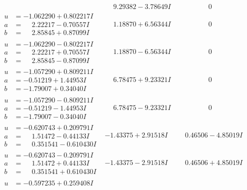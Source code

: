\documentclass[1p]{elsarticle_modified}
\theoremstyle{definition}
\begin{document}
$$\begin{array}{c|c|c}
 & \phantom{-}9.29382 - 3.78649 I & \phantom{-0.000000 } 0 \\ \hline\begin{aligned}
u &= -1.062290 + 0.802217 I \\
a &= \phantom{-}2.22217 - 0.70557 I \\
b &= \phantom{-}2.85845 + 0.87099 I\end{aligned}
 & \phantom{-}1.18870 + 6.56344 I & \phantom{-0.000000 } 0 \\ \hline\begin{aligned}
u &= -1.062290 - 0.802217 I \\
a &= \phantom{-}2.22217 + 0.70557 I \\
b &= \phantom{-}2.85845 - 0.87099 I\end{aligned}
 & \phantom{-}1.18870 - 6.56344 I & \phantom{-0.000000 } 0 \\ \hline\begin{aligned}
u &= -1.057290 + 0.809211 I \\
a &= -0.51219 + 1.44953 I \\
b &= -1.79007 + 0.34040 I\end{aligned}
 & \phantom{-}6.78475 + 9.23321 I & \phantom{-0.000000 } 0 \\ \hline\begin{aligned}
u &= -1.057290 - 0.809211 I \\
a &= -0.51219 - 1.44953 I \\
b &= -1.79007 - 0.34040 I\end{aligned}
 & \phantom{-}6.78475 - 9.23321 I & \phantom{-0.000000 } 0 \\ \hline\begin{aligned}
u &= -0.620743 + 0.209791 I \\
a &= \phantom{-}1.51472 - 0.44133 I \\
b &= \phantom{-}0.351541 - 0.610430 I\end{aligned}
 & -1.43375 + 2.91518 I & \phantom{-}0.46506 - 4.85019 I \\ \hline\begin{aligned}
u &= -0.620743 - 0.209791 I \\
a &= \phantom{-}1.51472 + 0.44133 I \\
b &= \phantom{-}0.351541 + 0.610430 I\end{aligned}
 & -1.43375 - 2.91518 I & \phantom{-}0.46506 + 4.85019 I \\ \hline\begin{aligned}
u &= -0.597235 + 0.259408 I \\

\end{aligned}
\end{array}$$
\end{document}
